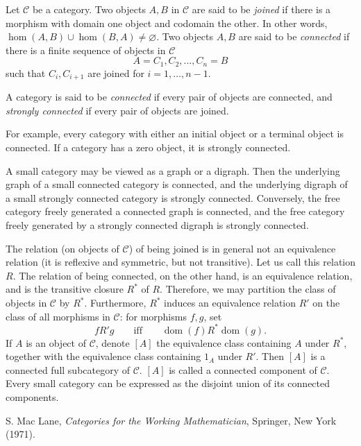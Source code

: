 \documentclass[12pt]{article}
\begin{document}
Let $\mathcal{C}$ be a category.  Two objects $A,B$ in $\mathcal{C}$ are said to be \emph{joined} if there is a morphism with domain one object and codomain the other.  In other words, $\hom(A,B)\cup \hom(B,A)\ne \varnothing$.  Two objects $A,B$ are said to be \emph{connected} if there is a finite sequence of objects in $\mathcal{C}$ $$A=C_1, C_2, \ldots, C_n = B$$ such that $C_i,C_{i+1}$ are joined for $i=1,\ldots,n-1$.

A category is said to be \emph{connected} if every pair of objects are connected, and \emph{strongly connected} if every pair of objects are joined.

For example, every category with either an initial object or a terminal object is connected.  If a category has a zero object, it is strongly connected.

A small category may be viewed as a graph or a digraph.  Then the underlying graph of a small connected category is connected, and the underlying digraph of a small strongly connected category is strongly connected.  Conversely, the free category freely generated a connected graph is connected, and the free category freely generated by a strongly connected digraph is strongly connected.

The relation (on objects of $\mathcal{C}$) of being joined is in general not an equivalence relation (it is reflexive and symmetric, but not transitive).  Let us call this relation $R$.  The relation of being connected, on the other hand, is an equivalence relation, and is the transitive closure $R^*$ of $R$.  Therefore, we may partition the class of objects in $\mathcal{C}$ by $R^*$.  Furthermore, $R^*$ induces an equivalence relation $R'$ on the class of all morphisms in $\mathcal{C}$: for morphisms $f,g$, set $$f R' g\qquad\mbox{iff}\qquad \operatorname{dom}(f) R^* \operatorname{dom}(g).$$  If $A$ is an object of $\mathcal{C}$, denote $[A]$ the equivalence class containing $A$ under $R^*$, together with the equivalence class containing $1_A$ under $R'$.  Then $[A]$ is a connected full subcategory of $\mathcal{C}$.  $[A]$ is called a connected component of $\mathcal{C}$.  Every small category can be expressed as the disjoint union of its connected components.

\begin{thebibliography}{9}
 S. Mac Lane, {\em Categories for the Working Mathematician}, Springer, New York (1971).
\end{thebibliography}
\end{document}
